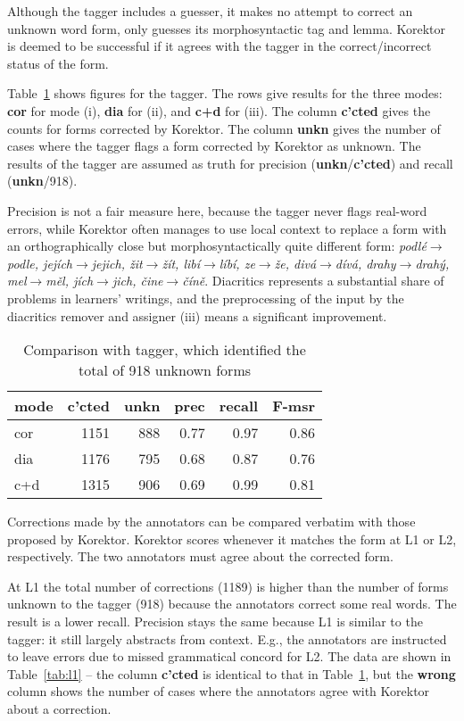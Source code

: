 \documentclass[11pt]{article}
\begin{document}
Although the tagger includes a guesser, it makes no
attempt to correct an unknown word form, only guesses its
morphosyntactic tag and lemma. Korektor is deemed to be
successful if it agrees with the tagger in the correct/incorrect status of the form.

Table~\ref{tab:morce} shows figures for the tagger. The rows
give results for the three modes: \textbf{cor} for mode (i),
\textbf{dia} for (ii), and
\textbf{c+d} for (iii). The column \textbf{c'cted} gives the
counts for forms corrected by Korektor. The
column \textbf{unkn} gives the number of cases where the tagger
flags a form corrected by Korektor as unknown. The results
of the tagger are assumed as truth for precision
(\textbf{unkn}/\textbf{c'cted}) and recall (\textbf{unkn}/918).

Precision is not a fair measure here, because the tagger never flags
real-word errors, while Korektor often manages to use local context to replace a form with an
orthographically close but morphosyntactically quite different form:
\emph{podlé$\rightarrow$podle, jejích$\rightarrow$jejich, žit$\rightarrow$žít,
libí$\rightarrow$líbí, ze$\rightarrow$že, divá$\rightarrow$dívá,
drahy$\rightarrow$drahý, mel$\rightarrow$měl, jích$\rightarrow$jich,
čine$\rightarrow$číně}. Diacritics represents a
substantial share of problems in learners' writings, and the preprocessing of
the input by the diacritics remover and assigner (iii) means a significant
improvement.

\begin{table}[h]
  \centering
\begin{tabular}[htbp]{l|rrrrr}
 mode & c'cted & unkn & prec & recall & F-msr \\ \hline
cor & 1151 & 888 & 0.77 & 0.97 & 0.86 \\
dia & 1176 & 795 & 0.68 & 0.87 & 0.76 \\
c+d & 1315 & 906 & 0.69 & 0.99 & 0.81  
\end{tabular}
\caption{Comparison with tagger, which identified the total of
918 unknown forms}
\label{tab:morce}
\end{table}

Corrections made by the annotators can be compared verbatim with those
proposed by Korektor. Korektor scores whenever it matches the form at L1 or
L2, respectively. The two annotators must agree about the
corrected form.

At L1 the total number of corrections (1189) is higher than the
number of forms unknown to the tagger (918) because
the annotators correct some real words. The result is a lower recall. Precision stays
the same because 
L1 is similar to the tagger: it still largely abstracts from
context. E.g., the annotators are instructed to leave errors due to missed
grammatical concord for L2. The data are shown in
Table~\ref{tab:l1} -- the column \textbf{c'cted} is identical to that
in Table~\ref{tab:morce}, but the \textbf{wrong} column shows the
number of cases where the annotators agree with Korektor about a
correction.
\end{document}
